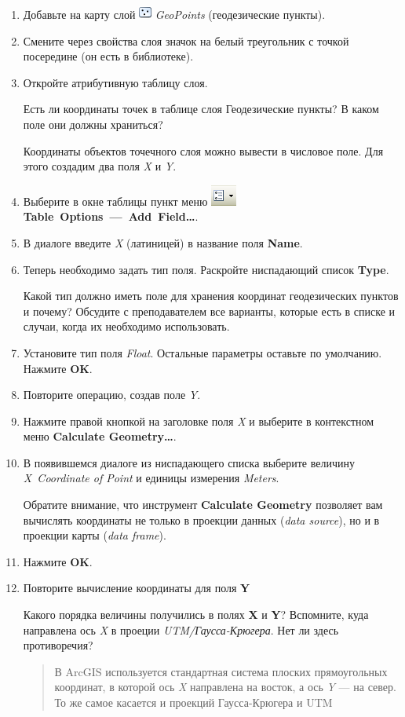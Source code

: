 \documentclass[]{book}
\theoremstyle{definition}
\theoremstyle{definition}
\theoremstyle{definition}
\theoremstyle{remark}
\begin{document}
\begin{enumerate}
\def\labelenumi{\arabic{enumi}.}
\item
  Добавьте на карту слой \includegraphics{images/Ex03/image7.png}
  \emph{GeoPoints} (геодезические пункты).
\item
  Смените через свойства слоя значок на белый треугольник с точкой
  посередине (он есть в библиотеке).
\item
  Откройте атрибутивную таблицу слоя.

  Есть ли координаты точек в таблице слоя Геодезические пункты? В каком
  поле они должны храниться?

  Координаты объектов точечного слоя можно вывести в числовое поле. Для
  этого создадим два поля \emph{X} и \emph{Y}.
\item
  Выберите в окне таблицы пункт меню
  \includegraphics{images/Ex03/image24.png}
  \textbf{Table~Options~---~Add~Field\ldots{}}.
\item
  В диалоге введите \emph{X} (латиницей) в название поля \textbf{Name}.
\item
  Теперь необходимо задать тип поля. Раскройте ниспадающий список
  \textbf{Type}.

  Какой тип должно иметь поле для хранения координат геодезических
  пунктов и почему? Обсудите с преподавателем все варианты, которые есть
  в списке и случаи, когда их необходимо использовать.
\item
  Установите тип поля \emph{Float}. Остальные параметры оставьте по
  умолчанию. Нажмите \textbf{OK}.
\item
  Повторите операцию, создав поле \emph{Y}.
\item
  Нажмите правой кнопкой на заголовке поля \emph{X} и выберите в
  контекстном меню \textbf{Calculate Geometry\ldots{}}.
\item
  В появившемся диалоге из ниспадающего списка выберите величину
  \emph{X~Coordinate of Point} и единицы измерения \emph{Meters}.

  Обратите внимание, что инструмент \textbf{Calculate Geometry}
  позволяет вам вычислять координаты не только в проекции данных
  (\emph{data source}), но и в проекции карты (\emph{data frame}).
\item
  Нажмите \textbf{OK}.
\item
  Повторите вычисление координаты для поля \textbf{Y}

  Какого порядка величины получились в полях \textbf{X} и \textbf{Y}?
  Вспомните, куда направлена ось \emph{X} в проеции
  \emph{UTM/Гаусса-Крюгера}. Нет ли здесь противоречия?

  \begin{quote}
  В ArcGIS используется стандартная система плоских прямоугольных
  координат, в которой ось \emph{X} направлена на восток, а ось \emph{Y}
  --- на север. То же самое касается и проекций Гаусса-Крюгера и UTM
  \end{quote}
\end{enumerate}
\end{document}
